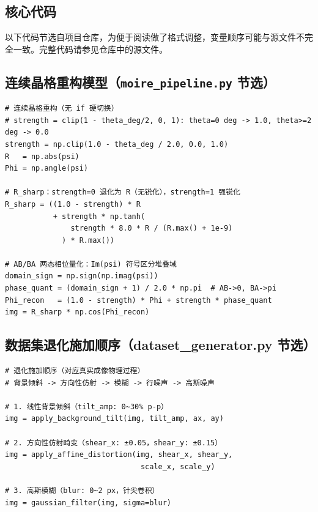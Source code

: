 \documentclass[supercite]{HustGraduPaper}
\begin{document}
\begin{appendices}

\section{核心代码}

以下代码节选自项目仓库，为便于阅读做了格式调整，变量顺序可能与源文件不完全一致。完整代码请参见仓库中的源文件。

\subsection{连续晶格重构模型（\texttt{moire\_pipeline.py} 节选）}

\begin{verbatim}
# 连续晶格重构（无 if 硬切换）
# strength = clip(1 - theta_deg/2, 0, 1): theta=0 deg -> 1.0, theta>=2 deg -> 0.0
strength = np.clip(1.0 - theta_deg / 2.0, 0.0, 1.0)
R   = np.abs(psi)
Phi = np.angle(psi)

# R_sharp：strength=0 退化为 R（无锐化），strength=1 强锐化
R_sharp = ((1.0 - strength) * R
           + strength * np.tanh(
               strength * 8.0 * R / (R.max() + 1e-9)
             ) * R.max())

# AB/BA 两态相位量化：Im(psi) 符号区分堆叠域
domain_sign = np.sign(np.imag(psi))
phase_quant = (domain_sign + 1) / 2.0 * np.pi  # AB->0, BA->pi
Phi_recon   = (1.0 - strength) * Phi + strength * phase_quant
img = R_sharp * np.cos(Phi_recon)
\end{verbatim}

\subsection{数据集退化施加顺序（dataset\_generator.py 节选）}

\begin{verbatim}
# 退化施加顺序（对应真实成像物理过程）
# 背景倾斜 -> 方向性仿射 -> 模糊 -> 行噪声 -> 高斯噪声

# 1. 线性背景倾斜（tilt_amp: 0~30% p-p）
img = apply_background_tilt(img, tilt_amp, ax, ay)

# 2. 方向性仿射畸变（shear_x: ±0.05，shear_y: ±0.15）
img = apply_affine_distortion(img, shear_x, shear_y,
                               scale_x, scale_y)

# 3. 高斯模糊（blur: 0~2 px，针尖卷积）
img = gaussian_filter(img, sigma=blur)


\end{verbatim}
\end{appendices}
\end{document}
